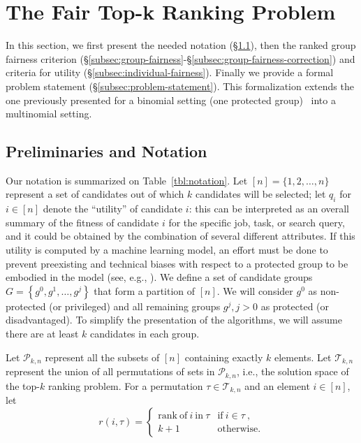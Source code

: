 
\section{The Fair Top-k Ranking Problem}\label{sec:problem}

In this section, we first present the needed notation (\S\ref{subsec:preliminaries}), then the ranked group fairness criterion (\S\ref{subsec:group-fairness}-\S\ref{subsec:group-fairness-correction}) and criteria for utility (\S\ref{subsec:individual-fairness}). Finally we provide a formal problem statement (\S\ref{subsec:problem-statement}).
%
This formalization extends the one previously presented for a binomial setting (one protected group)~\cite{zehlike2017fair} into a multinomial setting.

\subsection{Preliminaries and Notation}
\label{subsec:preliminaries}
Our notation is summarized on Table~\ref{tbl:notation}.
%
Let $[n] = \{ 1, 2, \dots, n \}$ represent a set of candidates out of which $k$ candidates will be selected; let $q_i$ for $i \in [n]$ denote the ``utility'' of candidate $i$: this can be interpreted as an overall summary of the fitness of candidate $i$ for the specific job, task, or search query, and it could be obtained by the combination of several different attributes.
%
If this utility is computed by a machine learning model, an effort must be done to prevent preexisting and technical biases with respect to a protected group to be embodied in the model (see, e.g., \cite{Sweeney2013}).
%
We define a set of candidate groups $G = \left\{ g^0, g^1, \ldots, g^j \right\}$ that form a partition of $[n]$. We will consider $g^0$ as non-protected (or privileged) and all remaining groups $g^j, j>0$ as protected (or disadvantaged).
%
To simplify the presentation of the algorithms, we will assume there are at least $k$ candidates in each group. %

Let ${\mathcal P}_{k,n}$ represent all the subsets of $[n]$ containing exactly $k$ elements.
%
Let ${\mathcal T}_{k,n}$ represent the union of all permutations of sets in ${\mathcal P}_{k,n}$, i.e., the solution space of the top-$k$ ranking problem.
%
For a permutation $\tau \in {\mathcal T}_{k,n}$ and an element $i \in [n]$, let
\[
r(i, \tau) = \begin{cases}
\mathrm{rank~of~} i \mathrm{~in~} \tau & \mathrm{if~} i \in \tau~, \\
k + 1 & \mathrm{otherwise}.
\end{cases}
\]


